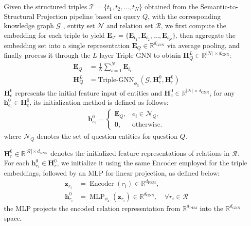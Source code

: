 \documentclass[11pt]{article}
\begin{document}
Given the structured triples \( \mathcal{T} = \{ t_1, t_2, ... , t_N \} \) obtained from the Semantic-to-Structural Projection pipeline based on query $Q$, with the corresponding knowledge graph $\mathcal{G}$ , entity set $\mathcal{N}$ and relation set 
$\mathcal{R}$, we first compute the embedding for each triple to yield \( \mathbf{E}_\mathcal{T} = \{ \mathbf{E}_{t_1}, \mathbf{E}_{t_2}, ... , \mathbf{E}_{t_N} \} \), then aggregate the embedding set into a single representation $\mathbf{E}_Q \in \mathbb{R}^{d_\text{GNN}}$ via average pooling, and finally process it through the $L$-layer Triple-GNN to obtain $\mathbf{H}^L_Q \in \mathbb{R}^{|\mathcal{N}|\times{d_\text{GNN}}}$:
\begin{align}
\mathbf{E}_Q &= \frac{1}{N}\sum_{i=1}^{N} \mathbf{E}_{t_i} \\
\mathbf{H}^L_Q &= \text{Triple-GNN}_{\phi_3}(\mathcal{G}, \mathbf{H}^0_e, \mathbf{H}^0_r)
\end{align}
$\mathbf{H}^0_e$ represents the initial feature input of entities and $\mathbf{H}^0_e \in \mathbb{R}^{|\mathcal{N}|\times{d_\text{GNN}}}$, for any $\mathbf{h}_{e_i}^0 \in \mathbf{H}^0_e$, its initialization method is defined as follows:
\begin{align}
\mathbf{h}_{e_i}^0 = \begin{cases} 
\mathbf{E}_Q, & e_i \in \mathcal{N}_{Q}, \\
\mathbf{0}, & \text{otherwise}.
\end{cases}
\end{align}
where $\mathcal{N}_{Q}$ denotes the set of question entities for question $Q$.

$\mathbf{H}^0_r \in \mathbb{R}^{|\mathcal{R}|\times d_\text{GNN}}$ denotes the initialized feature representations of relations in $\mathcal{R}$. For each $\mathbf{h}^0_{r_i} \in \mathbf{H}^0_r$, we initialize it using the same Encoder employed for the triple embeddings, followed by an MLP for linear projection, as defined below:
\begin{align}
    \mathbf{z}_{r_i} &= \operatorname{Encoder}(r_i) \in \mathbb{R}^{d_{\text{PEM}}}, \label{eq:rel_enc} \\
    \mathbf{h}^0_{r_i} &= \operatorname{MLP}_{\phi_4}(\mathbf{z}_{r_i}) \in \mathbb{R}^{d_{\text{GNN}}}, \quad \forall r_i \in \mathcal{R} \label{eq:rel_proj}
\end{align}
the MLP projects the encoded relation representation from 
$\mathbb{R}^{d_\text{PEM}}$ into the $\mathbb{R}^{d_\text{GNN}}$ space.
\end{document}
